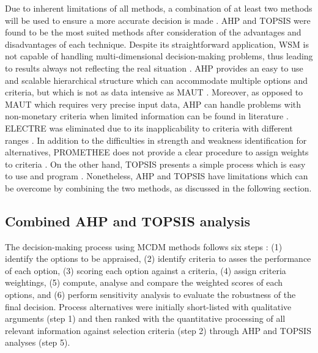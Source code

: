 Due to inherent limitations of all methods, a combination of at least two methods will be used to ensure a more accurate decision is made \cite{greco_multiple_2016}. AHP and TOPSIS were found to be the most suited methods after consideration of the advantages and disadvantages of each technique. Despite its straightforward application, WSM is not capable of handling multi-dimensional decision-making problems, thus leading to results always not reflecting the real situation \cite{pohekar_application_2004}. AHP provides an easy to use and scalable hierarchical structure which can accommodate multiple options and criteria, but which is not as data intensive as MAUT \cite{velasquez_analysis_2013}. Moreover, as opposed to MAUT which requires very precise input data, AHP can handle problems with  non-monetary criteria when limited information can be found in literature \cite{great_britain_multi-criteria_2009}. ELECTRE was eliminated due to its inapplicability to criteria with different ranges \cite{greco_multiple_2016}. In addition to the difficulties in strength and weakness identification for alternatives, PROMETHEE does not provide a clear procedure to assign weights to criteria \cite{velasquez_analysis_2013}. On the other hand, TOPSIS presents a simple process which is easy to use and program \cite{velasquez_analysis_2013}. Nonetheless, AHP and TOPSIS have limitations which can be overcome by combining the two methods, as discussed in the following section.


\subsection{Combined AHP and TOPSIS analysis} %

The decision-making process using MCDM methods follows six steps \cite{great_britain_multi-criteria_2009}: (1) identify the options to be appraised, (2) identify criteria to asses the performance of each option, (3) scoring each option against a criteria, (4) assign criteria weightings, (5) compute, analyse and compare the weighted scores of each options, and (6) perform sensitivity analysis to evaluate the robustness of the final decision.
Process alternatives were initially short-listed with qualitative arguments (step 1) and then ranked with the quantitative processing of all relevant information against selection criteria (step 2) through AHP and TOPSIS analyses (step 5). 

